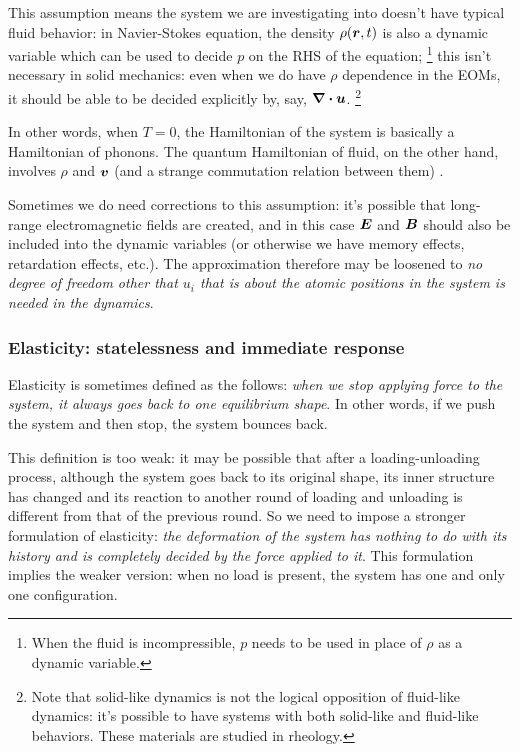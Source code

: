 \documentclass[hyperref, a4paper]{article}
\begin{document}
This assumption means the system we are investigating into 
doesn't have typical fluid behavior:
in Navier-Stokes equation, 
the density $\rho(\vb*{r}, t)$ is also a dynamic variable 
which can be used to decide $p$ on the RHS of the equation;%
\footnote{
    When the fluid is incompressible, 
    $p$ needs to be used in place of $\rho$ as a dynamic variable.
}
this isn't necessary in solid mechanics: 
even when we do have $\rho$ dependence in the EOMs, 
it should be able to be decided explicitly by, say, $\div{\vb*{u}}$.%
\footnote{
    Note that solid-like dynamics is not the logical opposition of fluid-like dynamics:
    it's possible to have systems with both solid-like and fluid-like behaviors.
    These materials are studied in rheology.
}

In other words, when $T = 0$, the Hamiltonian of the system is basically a Hamiltonian of phonons.
The quantum Hamiltonian of fluid,
on the other hand,
involves $\rho$ and $\vb*{v}$ (and a strange commutation relation between them) \cite{wiegmann2005}.

Sometimes we do need corrections to this assumption:
it's possible that long-range electromagnetic fields are created,
and in this case $\vb*{E}$ and $\vb*{B}$ should also be included into 
the dynamic variables (or otherwise we have memory effects, retardation effects, etc.).
The approximation therefore may be loosened to 
\emph{no degree of freedom other that $u_i$ that is about the atomic positions in the system 
is needed in the dynamics}.

\subsubsection{Elasticity: statelessness and immediate response}\label{sec:elasticity-def}

Elasticity is sometimes defined as the follows:
\emph{when we stop applying force to the system,
it always goes back to one equilibrium shape}.
In other words, 
if we push the system and then stop,
the system bounces back.

This definition is too weak:
it may be possible that after a loading-unloading process,
although the system goes back to its original shape,
its inner structure has changed 
and its reaction to another round of loading and unloading 
is different from that of the previous round.
So we need to impose a stronger formulation of elasticity:
\emph{the deformation of the system has nothing to do 
with its history 
and is completely decided by the force applied to it}.
This formulation implies the weaker version:
when no load is present,
the system has one and only one configuration. 
\end{document}
